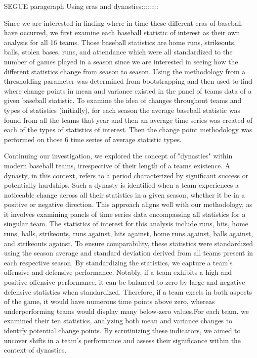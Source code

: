 \documentclass[USenglish]{article}
\theoremstyle{dgthm}
\theoremstyle{dgdef}
\begin{document}
SEGUE parageraph Using eras and dynasties:::::::::

Since we are interested in finding where in time these different eras of baseball have occurred, we first examine each baseball statistic of interest as their own analysis for all 16 teams. Those baseball statistics are home runs, strikeouts, balls, stolen bases, runs, and attendance which were all standardized to the number of games played in a season since we are interested in seeing how the different statistics change from season to season. Using the methodology from \cite{ChoFryzlewicz2014} a thresholding parameter was determined from bootstrapping and then used to find where change points in mean and variance existed in the panel of teams data of a given baseball statistic. To examine the idea of changes throughout teams and types of statistics (initially), for each season the average baseball statistic was found from all the teams that year and then an average time series was created of each of the types of statistics of interest. Then the change point methodology was performed on those 6 time series of average statistic types.

Continuing our investigation, we explored the concept of "dynasties" within modern baseball teams, irrespective of their length of a teams existence. A dynasty, in this context, refers to a period characterized by significant success or potentially hardships. Such a dynasty is identified when a team experiences a noticeable change across all their statistics in a given season, whether it be in a positive or negative direction. This approach aligns well with our methodology, as it involves examining panels of time series data encompassing all statistics for a singular team.
The statistics of interest for this analysis include runs, hits, home runs, balls, strikeouts, runs against, hits against, home runs against, balls against, and strikeouts against. To ensure comparability, these statistics were standardized using the season average and standard deviation derived from all teams present in each respective season. By standardizing the statistics, we capture a team's offensive and defensive performance. Notably, if a team exhibits a high and positive offensive performance, it can be balanced to zero by large and negative defensive statistics when standardized. Therefore, if a team excels in both aspects of the game, it would have numerous time points above zero, whereas underperforming teams would display many below-zero values.For each team, we examined their ten statistics, analyzing both mean and variance changes to identify potential change points. By scrutinizing these indicators, we aimed to uncover shifts in a team's performance and assess their significance within the context of dynasties.
\end{document}
